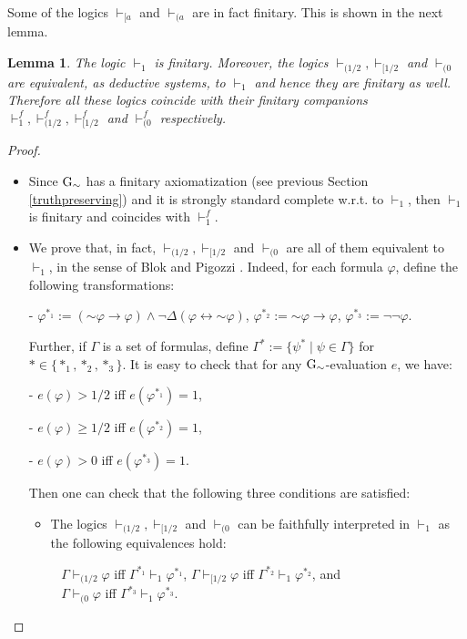 \documentclass{article}
\newtheorem{lemma}{Lemma}
\theoremstyle{definition}
\newcommand{\ninv}{\mathord{\sim}}
\begin{document}
Some of the logics $\vdash_{[a}$ and $\vdash_{(a}$ are in fact finitary. This is shown in the next lemma. 

\begin{lemma}  The logic $\vdash_1$ is finitary. Moreover, the logics $\vdash_{(1/2}, \vdash_{[1/2}$ and $\vdash_{(0}$ are equivalent, as deductive systems, to $\vdash_1$ and hence they are finitary as well. Therefore all these logics coincide with their finitary companions $\vdash^f_1, \vdash^f_{(1/2}, \vdash^f_{[1/2}$ and $\vdash^f_{(0}$ respectively.
\end{lemma}

\begin{proof}
\begin{itemize}

\item Since ${\rm G}_{\ninv}$ has a finitary axiomatization (see previous Section \ref{truthpreserving}) and it is strongly standard complete w.r.t. to $\vdash_{1}$, then $\vdash_{1}$ is finitary and  coincides with $\vdash^f_{1}$. 

\item We prove that, in fact, $\vdash_{(1/2}, \vdash_{[1/2}$ and $\vdash_{(0}$ are all of them equivalent to $\vdash_1$, in the sense of Blok and Pigozzi \cite{blok:pig:01}. Indeed, for each formula $\varphi$, define the following transformations: 

- $\varphi^{*_1} := (\ninv \varphi \to \varphi) \land \neg \Delta (\varphi \leftrightarrow \ninv \varphi)$, $\varphi^{*_2} := \ninv \varphi \to \varphi$, $\varphi^{*_3} := \neg\neg \varphi$.

Further, if  $\Gamma$ is a set of formulas, define $\Gamma^* := \{ \psi^* \mid \psi \in \Gamma \}$ for $* \in \{*_1, *_2, *_3  \}$. 
It is easy to check that  for any ${\rm G}_{\ninv}$-evaluation $e$, we have: 

- $e(\varphi) > 1/2$ iff $e(\varphi^{*_1}) =1$, 

- $e(\varphi) \geq 1/2$ iff $e(\varphi^{*_2}) =1$, 

- $e(\varphi) > 0$ iff $e(\varphi^{*_3}) =1$.

Then one can check that the following three conditions are satisfied: 

\begin{itemize}
\item[(i)]  The logics $\vdash_{(1/2}, \vdash_{[1/2}$ and $\vdash_{(0}$ can be faithfully interpreted in $\vdash_1$ as the following equivalences hold: 

\mbox{ } $\Gamma \vdash_{(1/2} \varphi$ iff $\Gamma^{*_1} \vdash_{1} \varphi^{*_1}$,  $\Gamma \vdash_{[1/2} \varphi$ iff $\Gamma^{*_2} \vdash_{1} \varphi^{*_2}$, and \\ \mbox{ } $\Gamma \vdash_{(0} \varphi$ iff $\Gamma^{*_3} \vdash_{1} \varphi^{*_3}$.


\end{itemize}
\end{itemize}
\end{proof}
\end{document}
